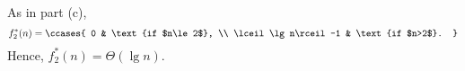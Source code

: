 As in part (c),
\[
    f_2^*(n) =
    \ccases{
        0 & \text{if $n\le2$}, \\
        \lceil\lg n\rceil-1 & \text{if $n>2$}.
    }
\]
Hence, $f_2^*(n)=\Theta(\lg n)$.
